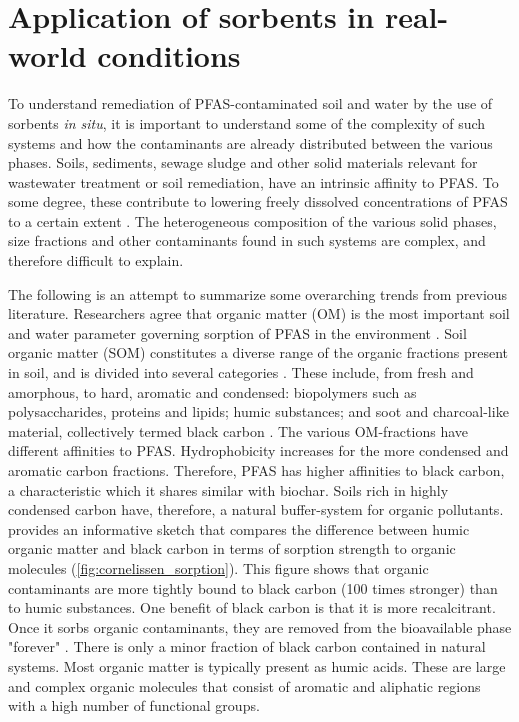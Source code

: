 \section{Application of sorbents in real-world conditions \label{sec:attenuation}}
To understand remediation of PFAS-contaminated soil and water by the use of sorbents \textit{in situ}, it is important to understand some of the complexity of such systems and how the contaminants are already distributed between the various phases. Soils, sediments, sewage sludge and other solid materials relevant for wastewater treatment or soil remediation, have an intrinsic affinity to PFAS. To some degree, these contribute to lowering freely dissolved concentrations of PFAS to a certain extent \citep{arvaniti2014,zhang2013sorption}. The heterogeneous composition of the various solid phases, size fractions and other contaminants found in such systems are complex, and therefore difficult to explain. 

The following is an attempt to summarize some overarching trends from previous literature. Researchers agree that organic matter (OM) is the most important soil and water parameter governing sorption of PFAS in the environment \citep{zareitalabad2013perfluorooctanoic}. Soil organic matter (SOM) constitutes a diverse range of the organic fractions present in soil, and is divided into several categories \citep{Cornelissen2005}. These include, from fresh and amorphous, to hard, aromatic and condensed: biopolymers such as polysaccharides, proteins and lipids; humic substances; and soot and charcoal-like material, collectively termed black carbon \citep{cornelissen2004sorption}. The various OM-fractions have different affinities to PFAS. Hydrophobicity increases for the more condensed and aromatic carbon fractions. Therefore, PFAS has higher affinities to black carbon, a characteristic which it shares similar with biochar. Soils rich in highly condensed carbon have, therefore, a natural buffer-system for organic pollutants. \cite{Cornelissen2005} provides an informative sketch that compares the difference between humic organic matter and black carbon in terms of sorption strength to organic molecules (\cref{fig:cornelissen_sorption}). This figure shows that organic contaminants are more tightly bound to black carbon (100 times stronger) than to humic substances. One benefit of black carbon is that it is more recalcitrant. Once it sorbs organic contaminants, they are removed from the bioavailable phase "forever" \citep{Cornelissen2006}. There is only a minor fraction of black carbon contained in natural systems. Most organic matter is typically present as humic acids. These are large and complex organic molecules that consist of aromatic and aliphatic regions with a high number of functional groups. 

